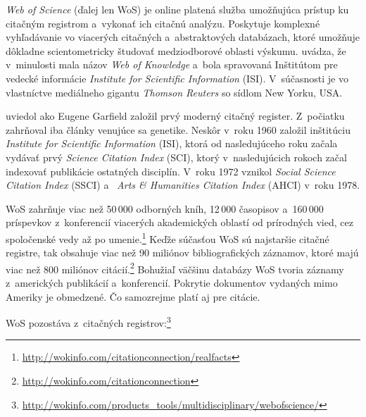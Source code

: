 \emph{Web of Science} (ďalej len WoS) je online platená služba umožňujúca
prístup ku citačným registrom a~vykonať ich citačnú analýzu.  Poskytuje
komplexné vyhľadávanie vo viacerých citačných a~abstraktových databázach, ktoré
umožňuje dôkladne scientometricky študovať medziodborové oblasti výskumu.
\citet{Drake2005} uvádza, že v~minulosti mala názov \emph{Web of Knowledge}
a~bola spravovaná Inštitútom pre vedecké informácie \emph{Institute for Scientific
  Information} (ISI).  V~súčasnosti je vo vlastníctve mediálneho gigantu
\emph{Thomson Reuters} so sídlom New Yorku, USA.

\citet{Smith2012} uviedol ako Eugene Garfield založil prvý moderný citačný
register.  Z~počiatku zahrňoval iba články venujúce sa genetike.  Neskôr v~roku
1960 založil inštitúciu \emph{Institute for Scientific Information} (ISI), ktorá
od nasledujúceho roku začala vydávať prvý 
\emph{Science Citation Index} (SCI), ktorý v~nasledujúcich rokoch začal
indexovať publikácie ostatných disciplín.  V~roku 1972 vznikol  \emph{Social Science Citation Index} (SSCI) a~ \emph{Arts \& Humanities Citation Index}
(AHCI) v~roku 1978.

WoS zahrňuje viac než 50\,000 odborných kníh, 12\,000 časopisov a~160\,000
príspevkov z~konferencií viacerých akademických oblastí od prírodných vied, cez
spoločenské vedy až po
umenie.\footnote{\url{http://wokinfo.com/citationconnection/realfacts}} Keďže
súčasťou WoS sú najstaršie citačné registre, tak obsahuje viac než 90 miliónov
bibliografických záznamov, ktoré majú viac než 800 miliónov
citácií.\footnote{\url{http://wokinfo.com/citationconnection}} Bohužiaľ väčšinu
databázy WoS tvoria záznamy z~amerických publikácií a~konferencií.  Pokrytie
dokumentov vydaných mimo Ameriky je obmedzené.  Čo samozrejme platí aj pre
citácie.

WoS pozostáva z~citačných
registrov:\footnote{\url{http://wokinfo.com/products_tools/multidisciplinary/webofscience/}}

